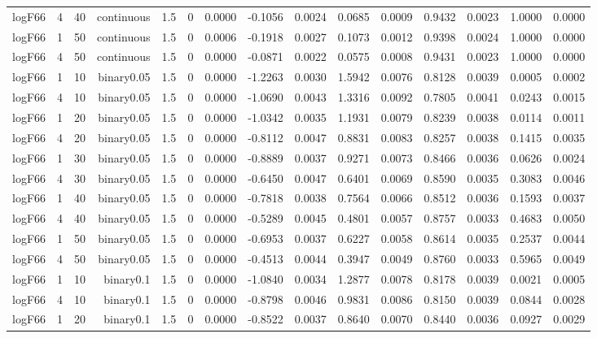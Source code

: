 \begin{longtable}{rrrrrrrrrrrrrrr}
  logF66 & 4 & 40 & continuous & 1.5 & 0 & 0.0000 & -0.1056 & 0.0024 & 0.0685 & 0.0009 & 0.9432 & 0.0023 & 1.0000 & 0.0000 \\ 
  logF66 & 1 & 50 & continuous & 1.5 & 0 & 0.0006 & -0.1918 & 0.0027 & 0.1073 & 0.0012 & 0.9398 & 0.0024 & 1.0000 & 0.0000 \\ 
  logF66 & 4 & 50 & continuous & 1.5 & 0 & 0.0000 & -0.0871 & 0.0022 & 0.0575 & 0.0008 & 0.9431 & 0.0023 & 1.0000 & 0.0000 \\ 
  logF66 & 1 & 10 & binary0.05 & 1.5 & 0 & 0.0000 & -1.2263 & 0.0030 & 1.5942 & 0.0076 & 0.8128 & 0.0039 & 0.0005 & 0.0002 \\ 
  logF66 & 4 & 10 & binary0.05 & 1.5 & 0 & 0.0000 & -1.0690 & 0.0043 & 1.3316 & 0.0092 & 0.7805 & 0.0041 & 0.0243 & 0.0015 \\ 
  logF66 & 1 & 20 & binary0.05 & 1.5 & 0 & 0.0000 & -1.0342 & 0.0035 & 1.1931 & 0.0079 & 0.8239 & 0.0038 & 0.0114 & 0.0011 \\ 
  logF66 & 4 & 20 & binary0.05 & 1.5 & 0 & 0.0000 & -0.8112 & 0.0047 & 0.8831 & 0.0083 & 0.8257 & 0.0038 & 0.1415 & 0.0035 \\ 
  logF66 & 1 & 30 & binary0.05 & 1.5 & 0 & 0.0000 & -0.8889 & 0.0037 & 0.9271 & 0.0073 & 0.8466 & 0.0036 & 0.0626 & 0.0024 \\ 
  logF66 & 4 & 30 & binary0.05 & 1.5 & 0 & 0.0000 & -0.6450 & 0.0047 & 0.6401 & 0.0069 & 0.8590 & 0.0035 & 0.3083 & 0.0046 \\ 
  logF66 & 1 & 40 & binary0.05 & 1.5 & 0 & 0.0000 & -0.7818 & 0.0038 & 0.7564 & 0.0066 & 0.8512 & 0.0036 & 0.1593 & 0.0037 \\ 
  logF66 & 4 & 40 & binary0.05 & 1.5 & 0 & 0.0000 & -0.5289 & 0.0045 & 0.4801 & 0.0057 & 0.8757 & 0.0033 & 0.4683 & 0.0050 \\ 
  logF66 & 1 & 50 & binary0.05 & 1.5 & 0 & 0.0000 & -0.6953 & 0.0037 & 0.6227 & 0.0058 & 0.8614 & 0.0035 & 0.2537 & 0.0044 \\ 
  logF66 & 4 & 50 & binary0.05 & 1.5 & 0 & 0.0000 & -0.4513 & 0.0044 & 0.3947 & 0.0049 & 0.8760 & 0.0033 & 0.5965 & 0.0049 \\ 
  logF66 & 1 & 10 & binary0.1 & 1.5 & 0 & 0.0000 & -1.0840 & 0.0034 & 1.2877 & 0.0078 & 0.8178 & 0.0039 & 0.0021 & 0.0005 \\ 
  logF66 & 4 & 10 & binary0.1 & 1.5 & 0 & 0.0000 & -0.8798 & 0.0046 & 0.9831 & 0.0086 & 0.8150 & 0.0039 & 0.0844 & 0.0028 \\ 
  logF66 & 1 & 20 & binary0.1 & 1.5 & 0 & 0.0000 & -0.8522 & 0.0037 & 0.8640 & 0.0070 & 0.8440 & 0.0036 & 0.0927 & 0.0029 \\ 

\end{longtable}
